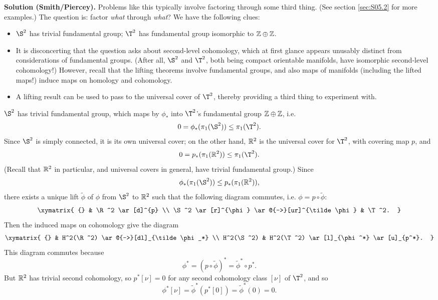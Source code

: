 \documentclass[10pt]{article}
\numberwithin{equation}{subsection}
\begin{document}
\textbf{Solution (Smith/Piercey).}  Problems like this typically involve
factoring through some third thing.  (See section \ref{sec:S05.2} for more
examples.)  The question is:  factor \emph{what} through \emph{what}?  We have
the following clues:
\begin{itemize}
\item $\S^2$ has trivial fundamental group; $\T^2$ has fundamental group
isomorphic to $\mathbb{Z}\oplus\mathbb{Z}$.

\item It is disconcerting that the question asks about second-level cohomology,
which at first glance appears unusably distinct from considerations of
fundamental groups.  (After all, $\S^2$ and $\T^2$, both being compact
orientable manifolds, have isomorphic second-level cohomology!)  However,
recall that the lifting theorems involve fundamental groups, and also maps of
manifolds (including the lifted maps!) induce maps on homology and cohomology.

\item A lifting result can be used to pass to the universal cover of $\T^2$,
thereby providing a third thing to experiment with.
\end{itemize}

$\S^2$ has trivial fundamental group, which maps by $\phi_*$ into $\T^2$'s
fundamental group $\mathbb{Z} \oplus \mathbb{Z}$, i.e.
$$
	0=\phi_*(\pi_1(\S^2)) \le \pi_1(\T^2).
$$
Since $\S^2$ is simply connected, it is its own universal cover; on the other
hand, $\mathbb{R}^2$ is the universal cover for $\T^2$, with covering map $p$, and
$$
	0=p_*(\pi_1(\R^2)) \le \pi_1(\T^2).
$$
(Recall that $\mathbb{R}^2$ in particular, and universal covers in general, have
trivial fundamental group.) Since
$$
	\phi_*(\pi_1(\S^2)) \le p_*(\pi_1(\R^2)),
$$
there exists a unique lift $\tilde\phi$ of $\phi$ from $\S^2$ to $\mathbb{R}^2$ such
that the following diagram commutes, i.e. $\phi = p\circ\tilde\phi$:
$$
\xymatrix{
	{} & \R^2 \ar[d]^{p} \\
	\S^2 \ar[r]^{\phi} \ar@{-->}[ur]^{\tilde\phi} & \T^2.
}
$$
Then the induced maps on cohomology give the diagram
$$
\xymatrix{
	{} & H^2(\R^2) \ar@{-->}[dl]_{\tilde\phi_*} \\
	H^2(\S^2) & H^2(\T^2) \ar[l]_{\phi^*} \ar[u]_{p^*}.
}
$$
This diagram commutes because
$$
	\phi^* = (p \circ \tilde\phi)^* = \tilde\phi^* \circ p^*.
$$
But $\mathbb{R}^2$ has trivial second cohomology, so $p^*[\nu]=0$ for any second
cohomology class $[\nu]$ of $\T^2$, and so
$$
	\phi^*[\nu] =
	\tilde\phi^*(p^*[0]) =
	\tilde\phi^*(0) = 0.
$$
\end{document}
